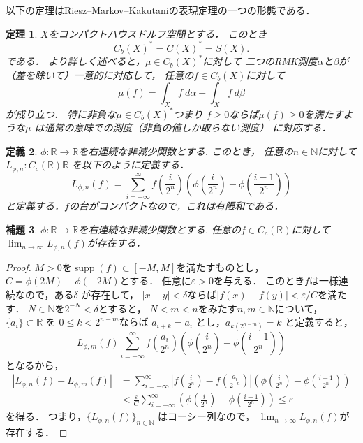 \documentclass[leqno, a4paper, 12pt]{jsarticle}
\newtheorem{thm}{定理}
\newtheorem{lem}[thm]{補題}
\newtheorem{df}[thm]{定義}
\newcommand{\nn}{\mathbb{N}}
\newcommand{\rr}{\mathbb{R}}
\newcommand{\ep}{\varepsilon}
\DeclareMathOperator{\supp}{supp}
\begin{document}
以下の定理はRiesz--Markov--Kakutaniの表現定理の一つの形態である．
\begin{thm}\label{thm:rmkdual}
$X$をコンパクトハウスドルフ空間とする．
このとき
\[
C_b(X)^*=C(X)^*=S(X). 
\]
である．
より詳しく述べると，$\mu\in C_{b}(X)^{*}$に対して
二つのRMK測度$\alpha$と$\beta$が（差を除いて）一意的に対応して，
任意の$f\in C_{b}(X)$に対して
\[
\mu(f)=\int_{X}f \ d\alpha -\int_{X}f\ d\beta
\]
が成り立つ．
特に非負な$\mu\in C_{b}(X)^{*}$つまり
$f\ge 0$ならば$\mu(f)\ge 0$を満たすような$\mu$
は通常の意味での測度（非負の値しか取らない測度）
に対応する．
\end{thm}



\begin{df}
$\phi:\rr\to \rr$を右連続な非減少関数とする.
このとき，
任意の$n\in \nn$に対して
$L_{\phi, n}:C_{c}(\rr)\rr$
を以下のように定義する．
\[
L_{\phi, n}(f)=\sum_{i=-\infty}^{\infty}f\left(\frac{i}{2^n}\right)\left(\phi\left(\frac{i}{2^n}\right)-\phi\left(\frac{i-1}{2^n}\right)\right)
\]
と定義する．$f$の台がコンパクトなので，これは有限和である．
\end{df}

\begin{lem}
$\phi:\rr\to \rr$を右連続な非減少関数とする.
任意の$f\in C_c(\rr)$に対して
$\lim_{n\to \infty}L_{\phi, n}(f)$が存在する．
\end{lem}
\begin{proof}
$M>0$を$\supp (f)\subset [-M, M]$を満たすものとし，
$C=\phi(2M)-\phi(-2M)$とする．
任意に$\ep>0$を与える．
このとき$f$は一様連続なので，ある$\delta$
が存在して，
$|x-y|<\delta$ならば$|f(x)-f(y)|<\ep/C$を満たす．
$N\in \nn$を$2^{-N}<\delta$とすると，
$N<m<n$をみたす$n, m\in \nn$について，
$\{a_i\}\subset \rr$
を
$0\le k<2^{n-m}$ならば
$a_{i+k}=a_i$
とし，$a_{k(2^{n-m})}=k$
と定義すると，
\[
L_{\phi, m}(f)
\sum_{i=-\infty}^{\infty}f\left(\frac{a_i}{2^n}\right)
\left(\phi\left(\frac{i}{2^n}\right)-\phi\left(\frac{i-1}{2^n}\right)\right)
\]
となるから，
\begin{align*}
|L_{\phi, n}(f)-L_{\phi, m}(f)|
&=
\sum_{i=-\infty}^{\infty}
\left|f\left(\frac{i}{2^n}\right)-f\left(\frac{a_i}{2^{-n}}\right)\right|
\left(\phi\left(\frac{i}{2^n}\right)-\phi\left(\frac{i-1}{2^n}\right)\right)\\
&<
\frac{\ep}{C}\sum_{i=-\infty}^{\infty}\left(\phi\left(\frac{i}{2^n}\right)-\phi\left(\frac{i-1}{2^n}\right)\right)
\le 
\ep
\end{align*}
を得る．
つまり，$\{L_{\phi, n}(f)\}_{n\in \nn}$
はコーシー列なので，
$\lim_{n\to \infty}L_{\phi, n}(f)$が存在する．
\end{proof}
\end{document}
